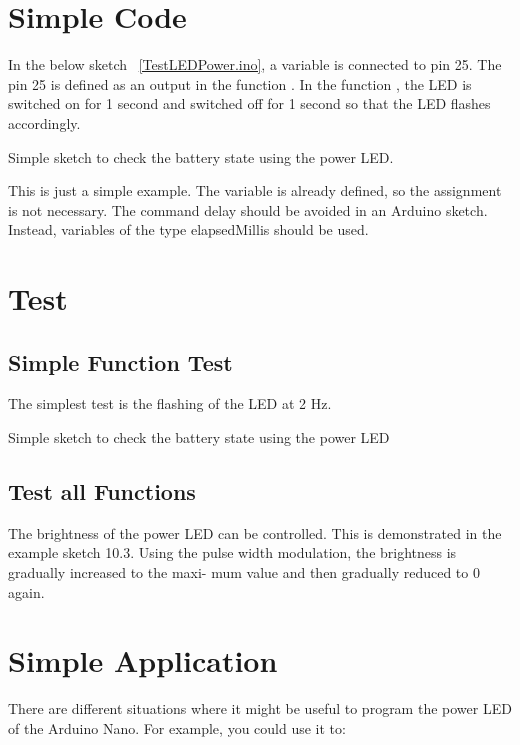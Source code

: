 \section{Simple Code}
In the below sketch ~\ref{TestLEDPower.ino}, a variable is connected to pin 25. The pin 25 is defined as an output in the function . In the function , the LED is switched on for 1 second and switched off for 1 second so that the LED flashes accordingly.


\begin{code}
	

	\caption{Simple sketch to check the battery state using the power LED.}\label{TestLEDPower.ino}
\end{code}


This is just a simple example. The variable  is already defined, so the assignment is not necessary. The command delay should be avoided in an Arduino sketch. Instead, variables of the type elapsedMillis should be used.

\section{Test}
\subsection{Simple Function Test}
The simplest test is the flashing of the LED at 2 Hz.

\begin{code}
	
	
	\caption{Simple sketch to check the battery state using the power LED}\label{TestLEDPowerBrightness.ino}
\end{code}

\subsection{Test all Functions}
The brightness of the power LED can be controlled. This is demonstrated in the example sketch 10.3.
Using the pulse width modulation, the brightness is gradually increased to the maxi- mum value and then gradually reduced to 0 again.


\section{Simple Application}
There are different situations where it might be useful to program the power LED of the Arduino Nano. For example, you could use it to:

